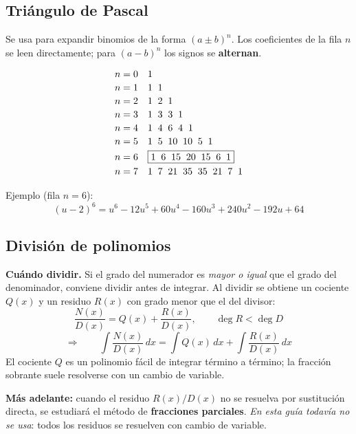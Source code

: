 \documentclass[12pt, letterpaper]{article}
\newcommand{\dx}{\,dx}
\begin{document}
\subsection{Triángulo de Pascal}

Se usa para expandir binomios de la forma $(a \pm b)^{n}$. Los coeficientes de la fila
$n$ se leen directamente; para $(a-b)^{n}$ los signos se \textbf{alternan}.

\[
\begin{array}{c@{\quad}l}
n=0 & 1\\[2pt]
n=1 & 1\;\;1\\[2pt]
n=2 & 1\;\;2\;\;1\\[2pt]
n=3 & 1\;\;3\;\;3\;\;1\\[2pt]
n=4 & 1\;\;4\;\;6\;\;4\;\;1\\[2pt]
n=5 & 1\;\;5\;\;10\;\;10\;\;5\;\;1\\[3pt]
n=6 & \boxed{1\;\;6\;\;15\;\;20\;\;15\;\;6\;\;1}\\[3pt]
n=7 & 1\;\;7\;\;21\;\;35\;\;35\;\;21\;\;7\;\;1
\end{array}
\]

\noindent Ejemplo (fila $n=6$):
\[
(u-2)^{6} = u^{6} - 12u^{5} + 60u^{4} - 160u^{3} + 240u^{2} - 192u + 64
\]

\subsection{División de polinomios}

\begin{cuadroteoria}
\textbf{Cuándo dividir.} Si el grado del numerador es \emph{mayor o igual} que el grado
del denominador, conviene dividir antes de integrar. Al dividir se obtiene un cociente
$Q(x)$ y un residuo $R(x)$ con grado menor que el del divisor:
\[
\frac{N(x)}{D(x)} = Q(x) + \frac{R(x)}{D(x)},
\qquad \deg R < \deg D
\]
\[
\Longrightarrow\qquad
\int \frac{N(x)}{D(x)}\dx = \int Q(x)\dx + \int \frac{R(x)}{D(x)}\dx
\]
El cociente $Q$ es un polinomio fácil de integrar término a término; la fracción
sobrante suele resolverse con un cambio de variable.
\end{cuadroteoria}

\begin{cuadroextra}
\textbf{Más adelante:} cuando el residuo $R(x)/D(x)$ no se resuelva por sustitución
directa, se estudiará el método de \textbf{fracciones parciales}. \emph{En esta guía
todavía no se usa}: todos los residuos se resuelven con cambio de variable.
\end{cuadroextra}
\end{document}
